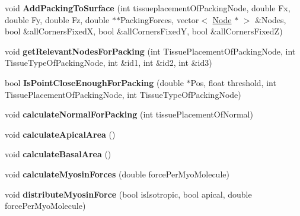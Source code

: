 \begin{DoxyCompactItemize}
\item 
\hypertarget{classPrism_aea2d84b05534bb2aedcdb49a53eab1ae}{}void {\bfseries Add\+Packing\+To\+Surface} (int tissueplacement\+Of\+Packing\+Node, double Fx, double Fy, double Fz, double $\ast$$\ast$Packing\+Forces, vector$<$ \hyperlink{classNode}{Node} $\ast$ $>$ \&Nodes, bool \&all\+Corners\+Fixed\+X, bool \&all\+Corners\+Fixed\+Y, bool \&all\+Corners\+Fixed\+Z)\label{classPrism_aea2d84b05534bb2aedcdb49a53eab1ae}

\item 
\hypertarget{classPrism_aa153c49304a9d808af5ea65a40f89128}{}void {\bfseries get\+Relevant\+Nodes\+For\+Packing} (int Tissue\+Placement\+Of\+Packing\+Node, int Tissue\+Type\+Of\+Packing\+Node, int \&id1, int \&id2, int \&id3)\label{classPrism_aa153c49304a9d808af5ea65a40f89128}

\item 
\hypertarget{classPrism_a45363ee4cc0dddd82ef567846a6bf123}{}bool {\bfseries Is\+Point\+Close\+Enough\+For\+Packing} (double $\ast$Pos, float threshold, int Tissue\+Placement\+Of\+Packing\+Node, int Tissue\+Type\+Of\+Packing\+Node)\label{classPrism_a45363ee4cc0dddd82ef567846a6bf123}

\item 
\hypertarget{classPrism_acb1603367b049392cebfc20b3aaeab87}{}void {\bfseries calculate\+Normal\+For\+Packing} (int tissue\+Placement\+Of\+Normal)\label{classPrism_acb1603367b049392cebfc20b3aaeab87}

\item 
\hypertarget{classPrism_a67e80515fb1cdf4438b4b7d47334bd2e}{}void {\bfseries calculate\+Apical\+Area} ()\label{classPrism_a67e80515fb1cdf4438b4b7d47334bd2e}

\item 
\hypertarget{classPrism_aa8dd4b90cdaecdbabfb48f45a9bcdc95}{}void {\bfseries calculate\+Basal\+Area} ()\label{classPrism_aa8dd4b90cdaecdbabfb48f45a9bcdc95}

\item 
\hypertarget{classPrism_a306261925defdb79ba64fc5f9ef8a23d}{}void {\bfseries calculate\+Myosin\+Forces} (double force\+Per\+Myo\+Molecule)\label{classPrism_a306261925defdb79ba64fc5f9ef8a23d}

\item 
\hypertarget{classPrism_ab11b5901fc7d65f71c7cccd1ce94a273}{}void {\bfseries distribute\+Myosin\+Force} (bool is\+Isotropic, bool apical, double force\+Per\+Myo\+Molecule)\label{classPrism_ab11b5901fc7d65f71c7cccd1ce94a273}


\end{DoxyCompactItemize}
